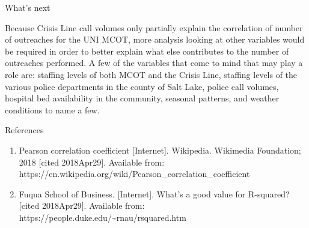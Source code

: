 \documentclass[11pt]{article}
\begin{document}
    What's next

    Because Crisis Line call volumes only partially explain the correlation
of number of outreaches for the UNI MCOT, more analysis looking at other
variables would be required in order to better explain what else
contributes to the number of outreaches performed. A few of the
variables that come to mind that may play a role are: staffing levels of
both MCOT and the Crisis Line, staffing levels of the various police
departments in the county of Salt Lake, police call volumes, hospital
bed availability in the community, seasonal patterns, and weather
conditions to name a few.

    References

    \begin{enumerate}
\def\labelenumi{(\arabic{enumi})}
\item
  Pearson correlation coefficient {[}Internet{]}. Wikipedia. Wikimedia
  Foundation; 2018 {[}cited 2018Apr29{]}. Available from:
  https://en.wikipedia.org/wiki/Pearson\_correlation\_coefficient
\item
  Fuqua School of Business. {[}Internet{]}. What's a good value for
  R-squared? {[}cited 2018Apr29{]}. Available from:
  https://people.duke.edu/\textasciitilde{}rnau/rsquared.htm
\end{enumerate}


    
    
    
    
\end{document}
